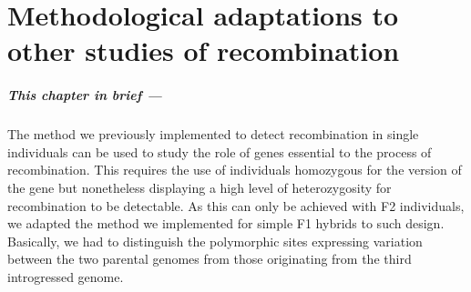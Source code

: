 \chapter{\label{ch:8-HFM1}Methodological adaptations to other studies of recombination}



\minitoc{}

{\small{} \itshape{}

\paragraph{This chapter in brief —}

The method we previously implemented to detect recombination in single individuals can be used to study the role of genes essential to the process of recombination.
This requires the use of individuals homozygous for the  version of the gene but nonetheless displaying a high level of heterozygosity for recombination to be detectable.
As this can only be achieved with F2 individuals,
%
we adapted the method we implemented for simple F1 hybrids to such design.
Basically, we had to distinguish the polymorphic sites expressing variation between the two parental genomes from those originating from the third introgressed genome.

}

